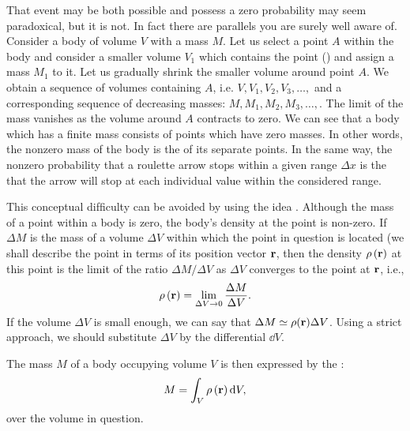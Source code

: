 That event may be both possible and possess a zero probability may
seem paradoxical, but it is not. In fact there are parallels you are
surely well aware of. Consider a body of volume $V$ with a mass
$M$. Let us select a point $A$ within the body and consider a smaller
volume $V_{1}$ which contains the point () and
assign a mass $M_{1}$ to it. Let us gradually shrink the smaller
volume around point $A$. We obtain a sequence of volumes containing
$A$, i.e. $V, V_{1}, V_{2}, V_{3}, \ldots ,$ and a corresponding
sequence of decreasing masses: $M, M_{1}, M_{2}, M_{3}, \ldots ,$. The
limit of the mass vanishes as the volume around $A$ contracts to
zero. We can see that a body which has a finite mass consists of
points which have zero masses. In other words, the nonzero mass of the
body is the  of its
separate points. In the same way, the nonzero probability that a
roulette arrow stops within a given range $\Delta x$ is the  that the arrow will
stop at each individual value within the considered range.





 This conceptual difﬁculty can
be avoided by using the idea . Although the mass of a
point within a body is zero, the body's density at the point is
non-zero. If $\Delta M$ is the mass of a volume $\Delta V$ within which
the point in question is located (we shall describe the point in terms
of its position vector $\vb{r}$, then the density $\rho \, (\vb{r})$ at
this point is the limit of the ratio $ \Delta M/ \Delta V$ as $\Delta V$ converges to the
point at $\vb{r}$, i.e.,
\begin{equation*}%
\rho \, (\vb{r}) = \lim_{\Delta V \to 0}  \frac{\Delta M}{\Delta V}.
\end{equation*}
If the volume $\Delta V$ is small enough, we can say that $\Delta M
\simeq \rho (\vb{r}) \Delta V$. Using a strict approach, we should
substitute $\Delta V$ by the differential $\dd V$.

The mass $M$ of a body occupying volume $V$ is then expressed by the
:
\begin{equation*}%
  M = \int_{V} \rho \,  (\vb{r}) \, \dd V,
\end{equation*}
over the volume in question.


